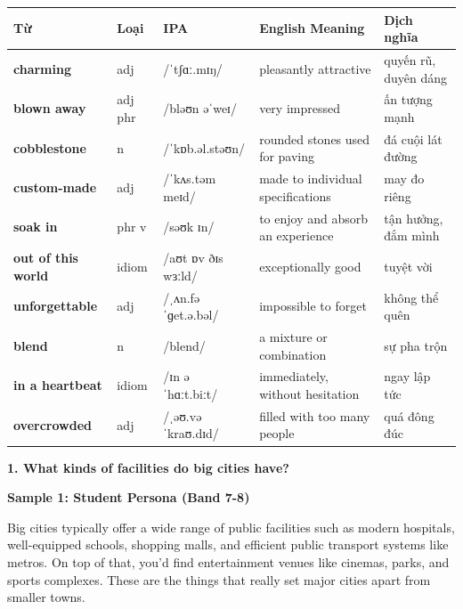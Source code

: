 \vspace{0.8em}
\begin{center}
\renewcommand{\arraystretch}{1.65}
\begin{tabularx}{\textwidth}{|V{0.22\textwidth}|C{0.07\textwidth}|I{0.20\textwidth}|Y|V{0.18\textwidth}|}
\hline
{}
\textbf{Từ} & \textbf{Loại} & \textbf{IPA} & \textbf{English Meaning} & \textbf{Dịch nghĩa} \\
\hline
\textbf{charming} & adj & /ˈtʃɑː.mɪŋ/ & pleasantly attractive & quyến rũ, duyên dáng \\ \hline
\textbf{blown away} & adj phr & /bləʊn əˈweɪ/ & very impressed & ấn tượng mạnh \\ \hline
\textbf{cobblestone} & n & /ˈkɒb.əl.stəʊn/ & rounded stones used for paving & đá cuội lát đường \\ \hline
\textbf{custom-made} & adj & /ˈkʌs.təm meɪd/ & made to individual specifications & may đo riêng \\ \hline
\textbf{soak in} & phr v & /səʊk ɪn/ & to enjoy and absorb an experience & tận hưởng, đắm mình \\ \hline
\textbf{out of this world} & idiom & /aʊt ɒv ðɪs wɜːld/ & exceptionally good & tuyệt vời \\ \hline
\textbf{unforgettable} & adj & /ˌʌn.fəˈɡet.ə.bəl/ & impossible to forget & không thể quên \\ \hline
\textbf{blend} & n & /blend/ & a mixture or combination & sự pha trộn \\ \hline
\textbf{in a heartbeat} & idiom & /ɪn ə ˈhɑːt.biːt/ & immediately, without hesitation & ngay lập tức \\ \hline
\textbf{overcrowded} & adj & /ˌəʊ.vəˈkraʊ.dɪd/ & filled with too many people & quá đông đúc \\ \hline
\end{tabularx}
\end{center}

\partthreeheader

\begin{ieltsquestion}
\textbf{1. What kinds of facilities do big cities have?}
\end{ieltsquestion}
\textbf{Sample 1: Student Persona (Band 7-8)}

Big cities typically offer a wide range of public facilities such as modern hospitals, well-equipped schools, shopping malls, and efficient public transport systems like metros. On top of that, you'd find entertainment venues like cinemas, parks, and sports complexes. These are the things that really set major cities apart from smaller towns.

